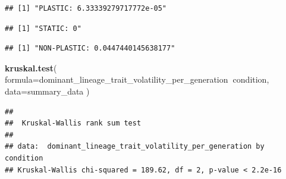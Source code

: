 \documentclass[]{book}
\newenvironment{Shaded}{\begin{snugshade}}{\end{snugshade}}
\newcommand{\DataTypeTok}[1]{\textcolor[rgb]{0.13,0.29,0.53}{#1}}
\newcommand{\KeywordTok}[1]{\textcolor[rgb]{0.13,0.29,0.53}{\textbf{#1}}}
\newcommand{\NormalTok}[1]{#1}
\newcommand{\OperatorTok}[1]{\textcolor[rgb]{0.81,0.36,0.00}{\textbf{#1}}}
\newcommand{\StringTok}[1]{\textcolor[rgb]{0.31,0.60,0.02}{#1}}
\begin{document}
\begin{verbatim}
## [1] "PLASTIC: 6.33339279717772e-05"
\end{verbatim}

\begin{Shaded}
\end{Shaded}

\begin{verbatim}
## [1] "STATIC: 0"
\end{verbatim}

\begin{Shaded}
\end{Shaded}

\begin{verbatim}
## [1] "NON-PLASTIC: 0.0447440145638177"
\end{verbatim}

\begin{Shaded}
\begin{Highlighting}[]
\KeywordTok{kruskal.test}\NormalTok{(}
  \DataTypeTok{formula=}\NormalTok{dominant_lineage_trait_volatility_per_generation}\OperatorTok{~}\NormalTok{condition,}
  \DataTypeTok{data=}\NormalTok{summary_data}
\NormalTok{)}
\end{Highlighting}
\end{Shaded}

\begin{verbatim}
## 
##  Kruskal-Wallis rank sum test
## 
## data:  dominant_lineage_trait_volatility_per_generation by condition
## Kruskal-Wallis chi-squared = 189.62, df = 2, p-value < 2.2e-16
\end{verbatim}

\begin{Shaded}
\end{Shaded}
\end{document}
